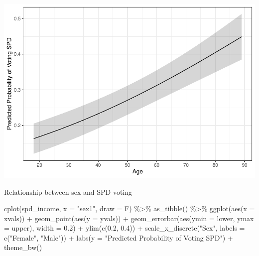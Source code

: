 \documentclass[
]{article}
\newenvironment{Shaded}{\begin{snugshade}}{\end{snugshade}}
\newcommand{\AttributeTok}[1]{\textcolor[rgb]{0.77,0.63,0.00}{#1}}
\newcommand{\FloatTok}[1]{\textcolor[rgb]{0.00,0.00,0.81}{#1}}
\newcommand{\FunctionTok}[1]{\textcolor[rgb]{0.00,0.00,0.00}{#1}}
\newcommand{\NormalTok}[1]{#1}
\newcommand{\SpecialCharTok}[1]{\textcolor[rgb]{0.00,0.00,0.00}{#1}}
\newcommand{\StringTok}[1]{\textcolor[rgb]{0.31,0.60,0.02}{#1}}
\begin{document}
\includegraphics{AVCD_Final_Assignment-Edenhofer_files/figure-latex/spd-age-1.pdf}

Relationship between sex and SPD voting

\begin{Shaded}
\begin{Highlighting}[]
\FunctionTok{cplot}\NormalTok{(spd\_income, }\AttributeTok{x =} \StringTok{"sex1"}\NormalTok{, }\AttributeTok{draw =}\NormalTok{ F) }\SpecialCharTok{\%\textgreater{}\%}
  \FunctionTok{as\_tibble}\NormalTok{() }\SpecialCharTok{\%\textgreater{}\%}
  \FunctionTok{ggplot}\NormalTok{(}\FunctionTok{aes}\NormalTok{(}\AttributeTok{x =}\NormalTok{ xvals)) }\SpecialCharTok{+}
  \FunctionTok{geom\_point}\NormalTok{(}\FunctionTok{aes}\NormalTok{(}\AttributeTok{y =}\NormalTok{ yvals)) }\SpecialCharTok{+}
  \FunctionTok{geom\_errorbar}\NormalTok{(}\FunctionTok{aes}\NormalTok{(}\AttributeTok{ymin =}\NormalTok{ lower, }\AttributeTok{ymax =}\NormalTok{ upper), }\AttributeTok{width =} \FloatTok{0.2}\NormalTok{) }\SpecialCharTok{+}
  \FunctionTok{ylim}\NormalTok{(}\FunctionTok{c}\NormalTok{(}\FloatTok{0.2}\NormalTok{, }\FloatTok{0.4}\NormalTok{)) }\SpecialCharTok{+}
  \FunctionTok{scale\_x\_discrete}\NormalTok{(}\StringTok{"Sex"}\NormalTok{, }\AttributeTok{labels =} \FunctionTok{c}\NormalTok{(}\StringTok{"Female"}\NormalTok{, }\StringTok{"Male"}\NormalTok{)) }\SpecialCharTok{+}
  \FunctionTok{labs}\NormalTok{(}\AttributeTok{y =} \StringTok{"Predicted Probability of Voting SPD"}\NormalTok{) }\SpecialCharTok{+}
  \FunctionTok{theme\_bw}\NormalTok{()}
\end{Highlighting}
\end{Shaded}
\end{document}
